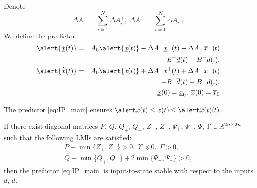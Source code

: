 \documentclass[slideopt,A4,showboxes,svgnames]{beamer}
\begin{document}
\begin{frame}
Denote
\[
\Delta A_{+}=\sum_{i=1}^{N}\Delta A_{i}^{+},\;\Delta A_{-}=\sum_{i=1}^{N}\Delta A_{i}^{-},
\]
We define the predictor
\begin{eqnarray}
\alert{\dot{\underline{x}}(t)} & = & A_{0}\alert{\underline{x}(t)}-\Delta A_{+}\underline{x}^{-}(t)-\Delta A_{-}\overline{x}^{+}(t)\nonumber \\
&  & +B^{+}\underline{d}(t)-B^{-}\overline{d}(t),\nonumber\\
\alert{\dot{\overline{x}}(t)} & = & A_{0}\alert{\overline{x}(t)}+\Delta A_{+}\overline{x}^{+}(t)+\Delta A_{-}\underline{x}^{-}(t)\label{eq:IP_main} \\
&  & +B^{+}\overline{d}(t)-B^{-}\underline{d}(t),\nonumber \\
&  & \underline{x}(0)=\underline{x}_{0},\;\overline{x}(0)=\overline{x}_{0}\nonumber 
\end{eqnarray}


\begin{theorem}
	\label{thm:main}
	The predictor \eqref{eq:IP_main} ensures $\ux\leq x(t)\leq \ox(t)$. 
\end{theorem}

\end{frame}

\begin{frame}

\begin{theorem}[Stability]
	If there exist diagonal matrices $P$, $Q$, $Q_{+}$, $Q_{-}$, $Z_{+}$, $Z_{-}$, $\Psi_{+}$, $\Psi_{-}$, $\Psi$, $\Gamma\in\mathbb{R}^{2n\times2n}$ such that the following LMIs are satisfied:
	\begin{gather*}
	P+\min\{Z_{+},Z_{-}\}>0,\;\Upsilon\preceq0,\;\Gamma>0,\\
	Q+\min\{Q_{+},Q_{-}\}+2\min\{\Psi_{+},\Psi_{-}\}>0,
	\end{gather*}
	then the predictor \eqref{eq:IP_main} is input-to-state stable with respect to the inputs $\underline{d}$, $\overline{d}$.
\end{theorem}
\end{frame}
\end{document}
